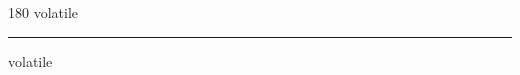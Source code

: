 
\begin{frame}
\begin{center}
\begin{turn}{180}
{\fontsize{2.5cm}{1em}\selectfont volatile}
\end{turn}
\vspace{1em}\par  
\hrule
\vspace{1em}\par  
{\fontsize{2.5cm}{1em}\selectfont volatile}
\end{center}
\end{frame}
